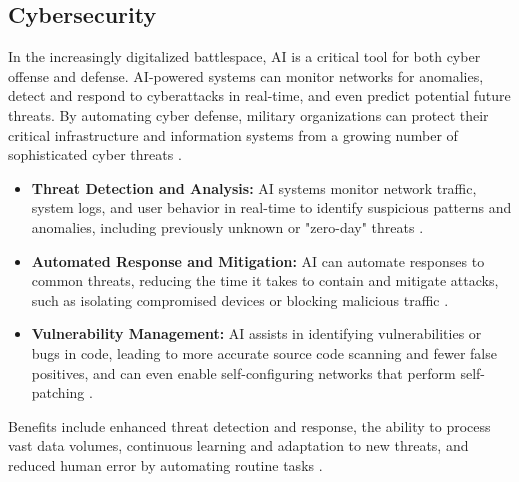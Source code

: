 \subsection{Cybersecurity}
In the increasingly digitalized battlespace, AI is a critical tool for both cyber offense and defense. AI-powered systems can monitor networks for anomalies, detect and respond to cyberattacks in real-time, and even predict potential future threats. By automating cyber defense, military organizations can protect their critical infrastructure and information systems from a growing number of sophisticated cyber threats \cite{sayler2020artificial}.
\begin{itemize}
    \item \textbf{Threat Detection and Analysis:} AI systems monitor network traffic, system logs, and user behavior in real-time to identify suspicious patterns and anomalies, including previously unknown or "zero-day" threats \cite{Fortinet_Cybersecurity, HedgehogSecurity_Cybersecurity}.
    \item \textbf{Automated Response and Mitigation:} AI can automate responses to common threats, reducing the time it takes to contain and mitigate attacks, such as isolating compromised devices or blocking malicious traffic \cite{Fortinet_Cybersecurity}.
    \item \textbf{Vulnerability Management:} AI assists in identifying vulnerabilities or bugs in code, leading to more accurate source code scanning and fewer false positives, and can even enable self-configuring networks that perform self-patching \cite{ECCU_Cybersecurity}.
\end{itemize}
Benefits include enhanced threat detection and response, the ability to process vast data volumes, continuous learning and adaptation to new threats, and reduced human error by automating routine tasks \cite{Syracuse_Cybersecurity, EuropaEU_Cybersecurity}.

